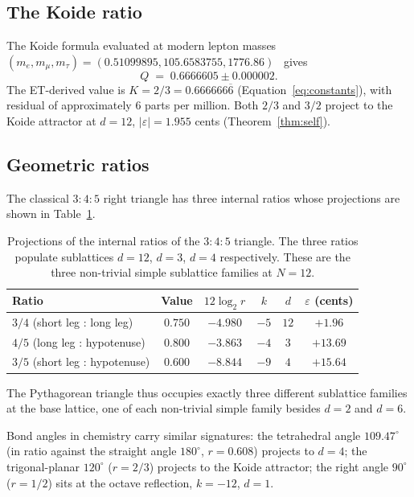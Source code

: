 \documentclass[11pt,a4paper]{article}
\theoremstyle{definition}
\theoremstyle{remark}
\newcommand{\eps}{\varepsilon}
\begin{document}
\subsection{The Koide ratio}\label{subsec:koide}

The Koide formula evaluated at modern lepton masses $(m_{e},m_{\mu},m_{\tau}) = (0.51099895, 105.6583755, 1776.86)$~\cite{CODATA2022} gives
\[
Q \;=\; 0.6666605\pm 0.000002.
\]
The ET-derived value is $K = 2/3 = 0.666666\overline{6}$ (Equation~\ref{eq:constants}), with residual of approximately $6$ parts per million. Both $2/3$ and $3/2$ project to the Koide attractor at $d=12$, $|\eps|=1.955$ cents (Theorem~\ref{thm:self}).

\subsection{Geometric ratios}\label{subsec:geometry}

The classical $3{:}4{:}5$ right triangle has three internal ratios whose projections are shown in Table~\ref{tab:pyth}.

\begin{table}[h]
\centering
\begin{tabular}{@{}l c c c c c@{}}
\toprule
Ratio & Value & $12\log_{2}r$ & $k$ & $d$ & $\eps$ (cents)\\
\midrule
$3/4$ (short leg : long leg) & $0.750$ & $-4.980$ & $-5$ & $12$ & $+1.96$\\
$4/5$ (long leg : hypotenuse) & $0.800$ & $-3.863$ & $-4$ & $3$ & $+13.69$\\
$3/5$ (short leg : hypotenuse) & $0.600$ & $-8.844$ & $-9$ & $4$ & $+15.64$\\
\bottomrule
\end{tabular}
\caption{Projections of the internal ratios of the $3{:}4{:}5$ triangle. The three ratios populate sublattices $d=12$, $d=3$, $d=4$ respectively. These are the three non-trivial simple sublattice families at $N=12$.}
\label{tab:pyth}
\end{table}

The Pythagorean triangle thus occupies exactly three different sublattice families at the base lattice, one of each non-trivial simple family besides $d=2$ and $d=6$.

Bond angles in chemistry carry similar signatures: the tetrahedral angle $109.47^{\circ}$ (in ratio against the straight angle $180^{\circ}$, $r = 0.608$) projects to $d=4$; the trigonal-planar $120^{\circ}$ ($r = 2/3$) projects to the Koide attractor; the right angle $90^{\circ}$ ($r = 1/2$) sits at the octave reflection, $k=-12$, $d=1$.
\end{document}
